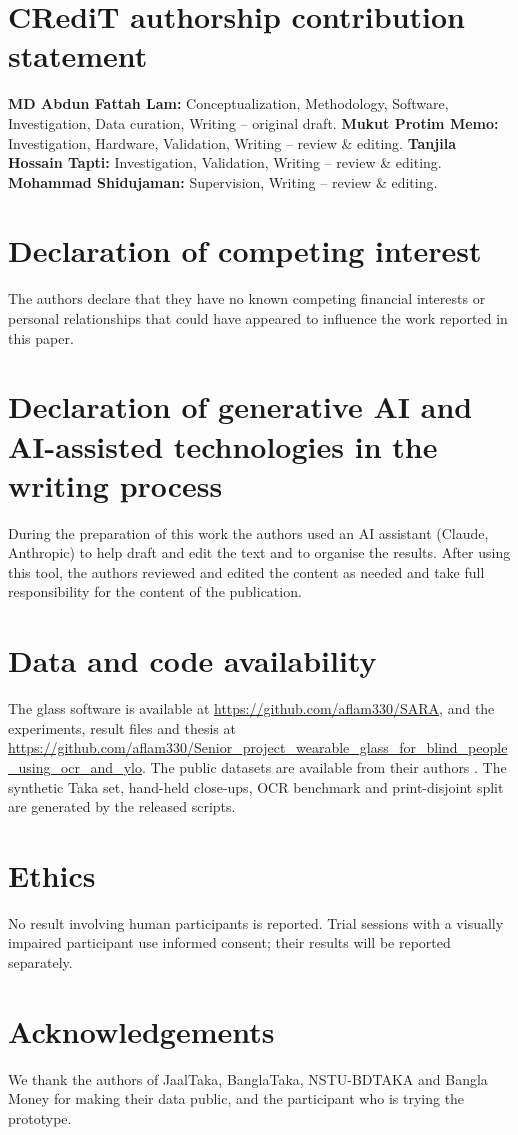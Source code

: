 \documentclass[preprint,12pt]{elsarticle}
\begin{document}
\section*{CRediT authorship contribution statement}
\textbf{MD Abdun Fattah Lam:} Conceptualization, Methodology, Software, Investigation, Data curation, Writing -- original draft. \textbf{Mukut Protim Memo:} Investigation, Hardware, Validation, Writing -- review \& editing. \textbf{Tanjila Hossain Tapti:} Investigation, Validation, Writing -- review \& editing. \textbf{Mohammad Shidujaman:} Supervision, Writing -- review \& editing.

\section*{Declaration of competing interest}
The authors declare that they have no known competing financial interests or personal relationships that could have appeared to influence the work reported in this paper.

\section*{Declaration of generative AI and AI-assisted technologies in the writing process}
During the preparation of this work the authors used an AI assistant (Claude, Anthropic) to help draft and edit the text and to organise the results. After using this tool, the authors reviewed and edited the content as needed and take full responsibility for the content of the publication.

\section*{Data and code availability}
The glass software is available at \url{https://github.com/aflam330/SARA}, and the experiments, result files and thesis at \url{https://github.com/aflam330/Senior_project_wearable_glass_for_blind_people_using_ocr_and_ylo}. The public datasets are available from their authors \cite{banglataka,jaaltaka,nstubdtaka2024,coco,rafdb,mlt2019}. The synthetic Taka set, hand-held close-ups, OCR benchmark and print-disjoint split are generated by the released scripts.

\section*{Ethics}
No result involving human participants is reported. Trial sessions with a visually impaired participant use informed consent; their results will be reported separately. %

\section*{Acknowledgements}
We thank the authors of JaalTaka, BanglaTaka, NSTU-BDTAKA and Bangla Money for making their data public, and the participant who is trying the prototype. %



\end{document}
